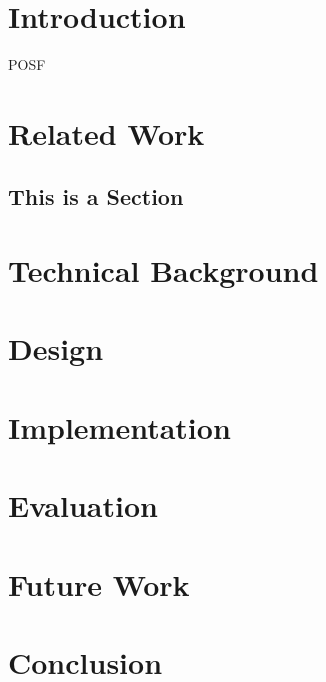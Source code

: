 \documentclass[
	11pt, 
	a4paper, 
	twoside, 
	openright, 
	titlepage=firstiscover, 
	numbers=noenddot, 
	BCOR=12mm,
	headsepline,
	footsepline,
	toc=listof,
	toc=bibliography
	]{scrbook}
\begin{document}

	
	
	 
	\tableofcontents
	

	\chapter{Introduction}
	\ac{POSF}
	
	\chapter{Related Work}
	\Blindtext[2][2]\cite{al-kodmany_sentient_2012}
	\section{This is a Section}
	
	\begin{definition}
		\Blindtext[1][1]
	\end{definition}
	\Blindtext[1][2]
	
	\chapter{Technical Background}
	\chapter{Design}
	\chapter{Implementation}
	\chapter{Evaluation}
	\chapter{Future Work}
	\chapter{Conclusion}
	
\end{document}
